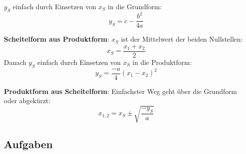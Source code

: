 $y_S$ einfach durch Einsetzen von $x_S$ in die Grundform:
$$y_S=c-\frac{b^2}{4a}$$
 
\textbf{Scheitelform aus Produktform}: $x_S$ ist der Mittelwert der beiden
Nullstellen:
$$x_S=\frac{x_1+x_2}{2}$$
Danach $y_S$ einfach durch Einsetzen von $x_S$ in die Produktform:
$$y_S=\frac{-a}{4}(x_1-x_2)^2$$

\textbf{Produktform aus Scheitelform}: Einfachster Weg geht über die Grundform oder abgekürzt:
$$x_{1,2} =x_S \pm \sqrt{\frac{-y_S}{a}}$$


\subsection{Aufgaben}



